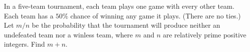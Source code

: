 In a five-team tournament, each team plays one game with every other team.  Each team has a $50\%$ chance of winning any game it plays.  (There are no ties.)  Let $m/n$ be the probability that the tournament will produce neither an undefeated team nor a winless team, where $m$ and $n$ are relatively prime positive integers.  Find $m+n$.